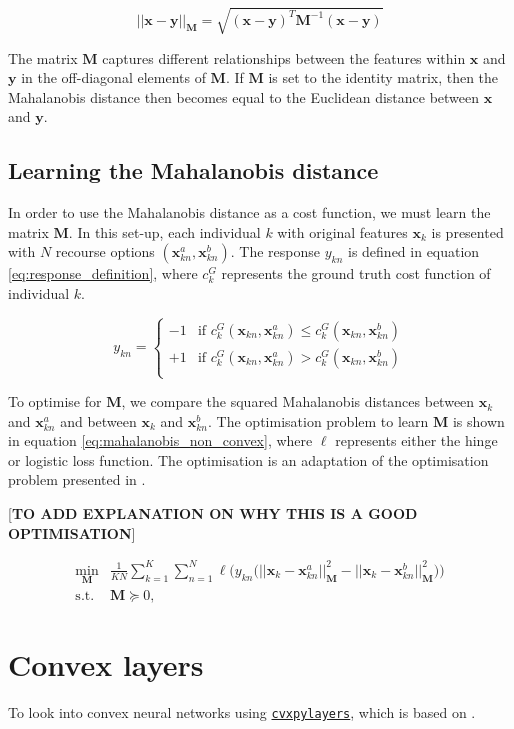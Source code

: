 \begin{equation} \label{eq:mahalanbobis_distance}
	||\mathbf{x-y}||_{\mathbf{M}} = \sqrt{(\mathbf{x-y})^T\mathbf{M}^{-1}(\mathbf{x-y})}
\end{equation}

The matrix $\mathbf{M}$ captures different relationships between the features within $\mathbf{x}$ and $\mathbf{y}$ in the off-diagonal elements of $\mathbf{M}$. If $\mathbf{M}$ is set to the identity matrix, then the Mahalanobis distance then becomes equal to the Euclidean distance between $\mathbf{x}$ and $\mathbf{y}$. \\

\subsection{Learning the Mahalanobis distance}

In order to use the Mahalanobis distance as a cost function, we must learn the matrix $\mathbf{M}$. In this set-up, each individual $k$ with original features $\mathbf{x}_k$ is presented with $N$ recourse options $(\mathbf{x}_{kn}^a, \mathbf{x}_{kn}^b)$. The response $y_{kn}$ is defined in equation \ref{eq:response_definition}, where $c^G_k$ represents the ground truth cost function of individual $k$.

\begin{equation} \label{eq:response_definition}
	y_{kn} = \begin{cases}
		-1 & \text{if } c^G_k(\mathbf{x}_{kn}, \mathbf{x}^a_{kn}) \leq c^G_k(\mathbf{x}_{kn}, \mathbf{x}^b_{kn}) \\
		+1 & \text{if } c^G_k(\mathbf{x}_{kn}, \mathbf{x}^a_{kn}) > c^G_k(\mathbf{x}_{kn}, \mathbf{x}^b_{kn}) \\
	\end{cases}
\end{equation}

To optimise for $\textbf{M}$, we compare the squared Mahalanobis distances between $\textbf{x}_k$ and $\textbf{x}^a_{kn}$ and between $\textbf{x}_k$ and $\textbf{x}^b_{kn}$. The optimisation problem to learn $\textbf{M}$ is shown in equation \ref{eq:mahalanobis_non_convex}, where $\ell$ represents either the hinge or logistic loss function. The optimisation is an adaptation of the optimisation problem presented in \textcite{canalOneAllSimultaneous2022}.

[\textbf{TO ADD EXPLANATION ON WHY THIS IS A GOOD OPTIMISATION}]

\begin{align} \label{eq:mahalanobis_non_convex}
	\min_{\mathbf{M}} & \frac{1}{KN} \sum_{k=1}^K \sum_{n=1}^N \ell \bigg( y_{kn} \big(|| \mathbf{x}_k - \mathbf{x}_{kn}^a ||^2_{\mathbf{M}} - || \mathbf{x}_k - \mathbf{x}_{kn}^b ||^2_{\mathbf{M}} \big) \bigg) \\	
	\text{s.t. } & \mathbf{M} \succeq 0, \nonumber
\end{align}

\section{Convex layers}

To look into convex neural networks using \href{https://github.com/cvxgrp/cvxpylayers}{\texttt{cvxpylayers}}, which is based on \textcite{agrawalDifferentiableConvexOptimization2019}.
